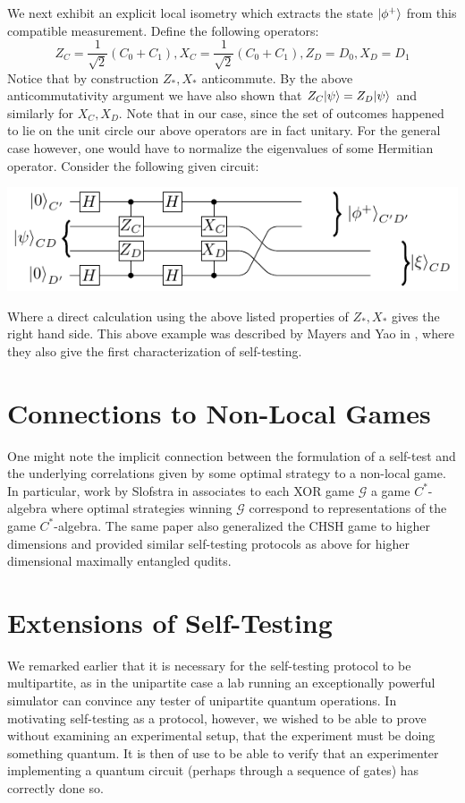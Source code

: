 \documentclass[runningheads,a4paper,english]{llncs}[2022/01/12]
\newcommand{\mcG}{\ensuremath{\mathcal{G}}}
\DeclarePairedDelimiter\ket{\lvert}{\rangle}
\begin{document}
We next exhibit an explicit local isometry which extracts the state $\ket{\phi^+}$ from this compatible measurement.
Define the following operators:
\[Z_C = \frac{1}{\sqrt{2}}(C_0 + C_1), X_C = \frac{1}{\sqrt{2}}(C_0+C_1), Z_D = D_0, X_D = D_1\]
Notice that by construction $Z_*, X_*$ anticommute.
By the above anticommutativity argument we have also shown that $Z_C\ket{\psi} = Z_D\ket{\psi}$ and similarly for $X_C, X_D$.
Note that in our case, since the set of outcomes happened to lie on the unit circle our above operators are in fact unitary.
For the general case however, one would have to normalize the eigenvalues of some Hermitian operator.
Consider the following given circuit:
\begin{center}
  \includegraphics[scale=1.2]{giraffics/CHSH-swap.pdf}
\end{center}
Where a direct calculation using the above listed properties of $Z_*, X_*$ gives the right hand side.
This above example was described by Mayers and Yao in \cite{mayers2003self}, where they also give the first characterization of self-testing.

\section{Connections to Non-Local Games}
One might note the implicit connection between the formulation of a self-test and the underlying correlations given by some optimal strategy to a non-local game.
In particular, work by Slofstra in \cite{slofstra2011lower} associates to each XOR game $\mcG$ a game $C^*$-algebra where optimal strategies winning $\mcG$ correspond to representations of the game $C^*$-algebra.
The same paper also generalized the CHSH game to higher dimensions and provided similar self-testing protocols as above for higher dimensional maximally entangled qudits.

\section{Extensions of Self-Testing}
We remarked earlier that it is necessary for the self-testing protocol to be multipartite, as in the unipartite case a lab running an exceptionally powerful simulator can convince any tester of unipartite quantum operations.
In motivating self-testing as a protocol, however, we wished to be able to prove without examining an experimental setup,
that the experiment must be doing something quantum.
It is then of use to be able to verify that an experimenter implementing a quantum circuit (perhaps through a sequence of gates) has correctly done so.
\end{document}
